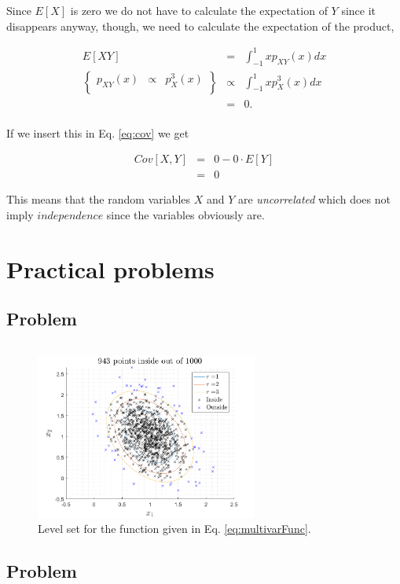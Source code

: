 \documentclass{article}
\begin{document}
Since $E[X]$ is zero we do not have to calculate the expectation of $Y$ since it disappears anyway, though, we need to calculate the expectation of the product,

\begin{equation}
	\begin{array}{rcl}
		E[XY]	& =			& \displaystyle\int_{-1}^{1}xp_{XY}(x)dx\\
		\left\{
			\begin{array}{rcl}
				p_{XY}(x) & \propto	& p_X^3(x) \\
			\end{array}
		\right\}	& \propto	& \displaystyle\int_{-1}^{1}xp_X^3(x)dx \\
				& = 		& 0. \\
	\end{array}
\end{equation}

If we insert this in Eq. \eqref{eq:cov} we get 

\begin{equation}
	\begin{array}{rcl}
		Cov[X,Y]	& =	& 0-0\cdot E[Y]\\
					& =	& 0
	\end{array}
\end{equation}

This means that the random variables $X$ and $Y$ are \textit{uncorrelated} which does not imply $independence$ since the variables obviously are.

\newpage 
\section{Practical problems}

\subsection{Problem} %

\begin{equation}
\label{eq:multivarFunc}
\end{equation}

\begin{figure}[H]
	\centering
	\includegraphics[width=0.65\textwidth]{plot2_1.png}
	\caption{\label{fig:levelSet} Level set for the function given in Eq. \eqref{eq:multivarFunc}.}
\end{figure}

\subsection{Problem} %
\end{document}
